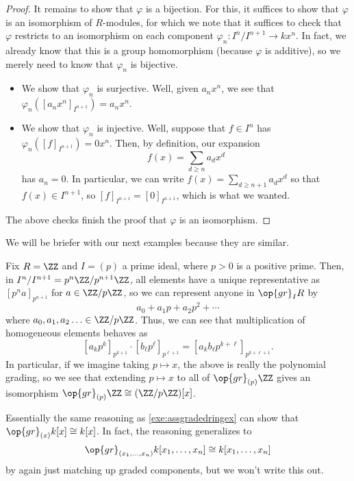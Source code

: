 \begin{proof}
	It remains to show that $\varphi$ is a bijection. For this, it suffices to show that $\varphi$ is an isomorphism of $R$-modules, for which we note that it suffices to check that $\varphi$ restricts to an isomorphism on each component $\varphi_n:I^n/I^{n+1}\to kx^n$. In fact, we already know that this is a group homomorphism (because $\varphi$ is additive), so we merely need to know that $\varphi_n$ is bijective.
	\begin{itemize}
		\item We show that $\varphi_n$ is surjective. Well, given $a_nx^n$, we see that $\varphi_n\left(\left[a_nx^n\right]_{I^{n+1}}\right)=a_nx^n$.
		\item We show that $\varphi_n$ is injective. Well, suppose that $f\in I^n$ has $\varphi_n\left([f]_{I^{n+1}}\right)=0x^n$. Then, by definition, our expansion
		\[f(x)=\sum_{d\ge n}a_dx^d\]
		has $a_n=0$. In particular, we can write $f(x)=\sum_{d\ge n+1}a_dx^d$ so that $f(x)\in I^{n+1}$, so $[f]_{I^{n+1}}=[0]_{I^{n+1}}$, which is what we wanted.
	\end{itemize}
	The above checks finish the proof that $\varphi$ is an isomorphism.
\end{proof}
We will be briefer with our next examples because they are similar.
\begin{example} %
	Fix $R=\ZZ$ and $I=(p)$ a prime ideal, where $p>0$ is a positive prime. Then, in $I^n/I^{n+1}=p^n\ZZ/p^{n+1}\ZZ$, all elements have a unique representative as $\left[p^na\right]_{p^{n+1}}$ for $a\in\ZZ/p\ZZ$, so we can represent anyone in $\op{gr}_IR$ by
	\[a_0+a_1p+a_2p^2+\cdots\]
	where $a_0,a_1,a_2\ldots\in\ZZ/p\ZZ$. Thus, we can see that multiplication of homogeneous elements behaves as
	\[\left[a_kp^k\right]_{p^{k+1}}\cdot\left[b_\ell p^\ell\right]_{p^{\ell+1}}=\left[a_kb_\ell p^{k+\ell}\right]_{p^{k+\ell+1}}.\]
	In particular, if we imagine taking $p\mapsto x$, the above is really the polynomial grading, so we see that extending $p\mapsto x$ to all of $\op{gr}_{(p)}\ZZ$ gives an isomorphism $\op{gr}_{(p)}\ZZ\cong(\ZZ/p\ZZ)[x]$.
\end{example}
\begin{remark}[Nir] \label{rem:affineassgradedring}
	Essentially the same reasoning as \autoref{exe:assgradedringex} can show that $\op{gr}_{(x)}k[x]\cong k[x]$. In fact, the reasoning generalizes to
	\[\op{gr}_{(x_1,\ldots,x_n)}k[x_1,\ldots,x_n]\cong k[x_1,\ldots,x_n]\]
	by again just matching up graded components, but we won't write this out.
\end{remark}

